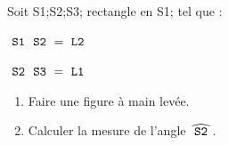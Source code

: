 \documentclass[exercice]{thedocument}%
\begin{document}
%
Soit \<S1;\<S2;\<S3; rectangle en \<S1; tel que :\par\smallskip
\hskip20pt$\text{\<S1;\<S2;}=\text{\<L2;}$\par\smallskip
\hskip20pt$\text{\<S2;\<S3;}=\text{\<L1;}$\par\bigskip
\begin{enumerate}
    \item Faire une figure à main levée.
    \item Calculer la mesure de l'angle $\widehat{\text{\<S2;}}$.
\end{enumerate}
\end{document}
